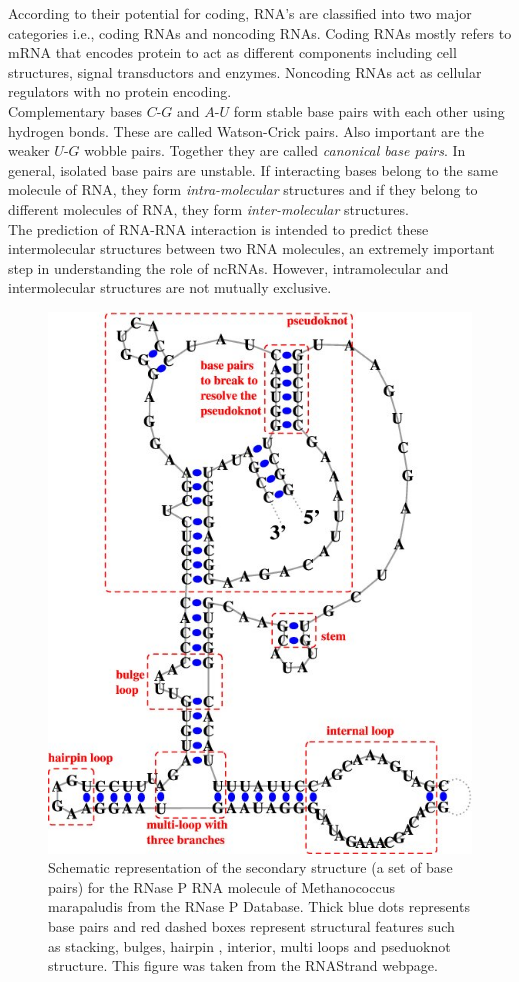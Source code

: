 \documentclass[twoside,a4paper]{report}
\begin{document}
	According to their potential for coding, RNA's are classified into two major categories i.e., coding RNAs and noncoding RNAs. Coding RNAs mostly refers to mRNA that encodes protein to act as different components including cell structures, signal transductors and enzymes. Noncoding RNAs act as cellular regulators with no protein encoding.\\
	Complementary bases $C$-$G$ and $A$-$U$ form stable base pairs with each other using hydrogen bonds. These are called Watson-Crick pairs. Also important are the weaker $U$-$G$ wobble pairs. Together they are called \textit{canonical base pairs}. In general, isolated base pairs are unstable. If interacting bases belong to the same molecule of RNA, they form \textit{intra-molecular} structures and if they belong to different molecules of RNA, they form \textit{inter-molecular} structures.\\
	
	The prediction of RNA-RNA interaction is intended to predict these intermolecular structures between two RNA molecules, an extremely important step in understanding the role of ncRNAs. However, intramolecular and intermolecular structures are not mutually exclusive.\\
	
	\begin{figure}[h]
	\includegraphics[width=0.7\linewidth]{secondary_structure}
	\centering
	\caption{Schematic representation of the secondary structure (a set of base pairs) for the RNase P RNA molecule of Methanococcus marapaludis from the RNase P Database. Thick blue dots represents base pairs and red dashed boxes represent structural features such as stacking, bulges, hairpin , interior, multi loops and pseduoknot structure. This figure was taken from the RNAStrand webpage.
	\label{fig:secondarystructure} 
    \citep{andronescu2008rna}}
	\end{figure}
\end{document}
